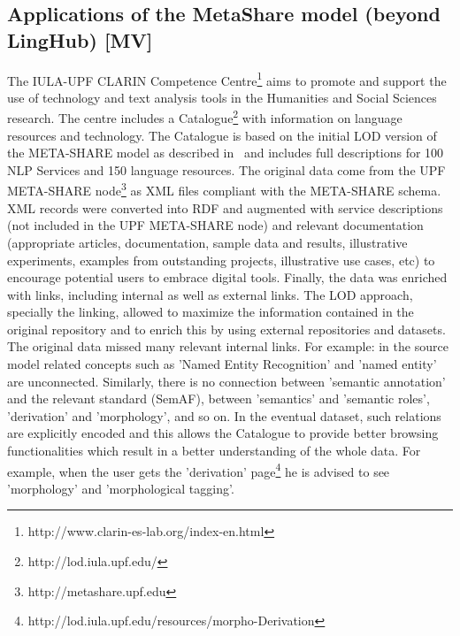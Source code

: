 \documentclass{llncs}
\begin{document}
{\subsection{Applications of the MetaShare model (beyond LingHub) [MV]}
\label{sec:applications}
The IULA-UPF CLARIN Competence Centre\footnote{http://www.clarin-es-lab.org/index-en.html} aims to promote and support the use of technology and text analysis tools in the Humanities and Social Sciences research. The centre includes a Catalogue\footnote{http://lod.iula.upf.edu/} with information on language resources and technology.
The Catalogue is based on the initial LOD version of the META-SHARE model as described in~\cite{Villegas2014} and includes full descriptions for 100 NLP Services and 150 language resources. The original data come from the UPF META-SHARE node\footnote{http://metashare.upf.edu} as XML files compliant with the META-SHARE schema. XML records were converted into RDF and augmented with service descriptions (not included in the UPF META-SHARE node) and relevant documentation (appropriate articles, documentation, sample data and results, illustrative experiments, examples from outstanding projects, illustrative use cases, etc) to encourage potential users to embrace digital tools. Finally, the data was enriched with links, including internal as well as external links.
The LOD approach, specially the linking, allowed to maximize the information contained in the original repository and to enrich this by using external repositories and datasets. The original data missed many relevant internal links. For example: in the source model related concepts such as 'Named Entity Recognition' and 'named entity' are unconnected. Similarly, there is no connection between 'semantic annotation' and the relevant standard (SemAF), between 'semantics' and 'semantic roles', 'derivation' and 'morphology', and so on. In the eventual dataset, such relations are explicitly encoded and this allows the Catalogue to provide better browsing functionalities which result in a better understanding of the whole data. For example, when the user gets the 'derivation' page\footnote{http://lod.iula.upf.edu/resources/morpho-Derivation} he is advised to see 'morphology' and 'morphological tagging'.
}
\end{document}
